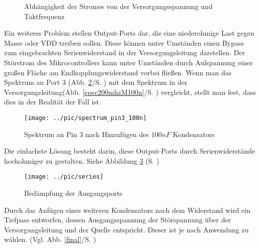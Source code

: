 \documentclass[a4paper,10pt, twocolumn]{article}
\begin{document}
\begin{section}
\begin{figure}[H]
  \caption{Abhängigkeit der Stromes von der Versorgungsspannung und 
Taktfrequenz}
  \label{datasheet}
\end{figure}
Ein weiteres Problem stellen Output-Ports dar, die eine niederohmige Last gegen
Masse oder VDD treiben sollen. Diese können unter Umständen 
einen Bypass zum eingebrachten Serienwiderstand in der Versorgungsleitung 
darstellen. Der Störstrom des Mikrocontrollers kann unter Umständen 
durch
Aufspannung einer großen Fläche am Endkopplungswiderstand vorbei fließen.
Wenn man das Spektrum an Port 3 (Abb. \ref{specpin3}/S. \pageref{specpin3}) mit 
dem Spektrum in der Versorgungsleitung(Abb. \ref{spec200mhzM100n}/S. 
\pageref{spec200mhzM100n}) vergleicht, stellt man fest, dass dies in der 
Realität der Fall ist.
\begin{figure}[H]
  \centering
  \texttt{[image: ../pic/spectrum\_pin3\_100n]}
  \caption{Spektrum an Pin 3 nach Hinzufügen des $100nF$ Kondensators}
  \label{specpin3}
\end{figure}
Die einfachste Lösung besteht darin, diese Output-Ports durch 
Serienwiderstände hochohmiger zu gestalten. Siehe Abbildung \ref{series} (S. 
\pageref{series}) \newline
\begin{figure}[H]
  \centering
  \texttt{[image: ../pic/series]}
  \caption{Bedämpfung der Ausgangsports}
  \label{series}
\end{figure}
\newpage
Durch das Anfügen eines weiteren Kondensators nach dem Widerstand wird ein 
Tiefpass entworfen, dessen Ausgangsspannung der Störspannung über der 
Versorgungsleitung und der Quelle entspricht. Dieser ist je nach Anwendung zu 
wählen. (Vgl. Abb. \ref{final}/S. \pageref{final}) 
\end{section}
\end{document}
